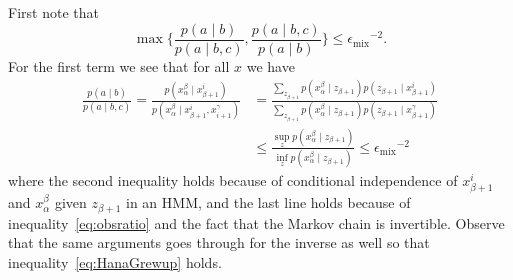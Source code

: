 \documentclass[twoside,11pt]{article}
\newcommand{\mixcoefeps}{\ensuremath{\epsilon_{\mathrm{mix}}}}
\begin{document}
First note that
\begin{equation}
\label{eq:HanaGrewup}
\max \Big \{ \frac{p(a \mid b)}{p(a \mid b,c)}, \frac{p(a \mid
  b,c)}{p(a\mid b)} \Big \} \leq \mixcoefeps^{-2}.
\end{equation}
For the first term we see that for all $x$ we have
\begin{align*}
\frac{p(a \mid b)}{p(a\mid b,c )} = \frac{p(x_{\alpha}^\beta\mid
  x_{\beta+1}^i)}{p(x_{\alpha}^\beta\mid x_{\beta + 1}^i,
  x_{i+1}^\gamma)} &= \frac{\sum_{z_{\beta+1}}p(x_{\alpha}^\beta \mid
  z_{\beta+1}) p(z_{\beta+1}\mid x_{\beta+1}^i)} {\sum_{z_{\beta+1}}
  p(x_{\alpha}^\beta \mid z_{\beta+1}) p(z_{\beta+1}\mid
  x_{\beta+1}^\gamma)}\\
%
&\leq 
\frac{\sup_z p(x_{\alpha}^\beta\mid z_{\beta+1})}{\inf_z p(x_{\alpha}^\beta\mid z_{\beta+1})} \leq \mixcoefeps^{-2}
\end{align*}
where the second inequality holds because of conditional independence
of $x_{\beta+1}^i$ and $x_{\alpha}^\beta$ given $z_{\beta+1}$ in an
HMM, and the last line holds because of inequality~\eqref{eq:obsratio}
and the fact that the Markov chain is invertible. Observe that the
same arguments goes through for the inverse as well so that
inequality~\eqref{eq:HanaGrewup} holds.
\end{document}
